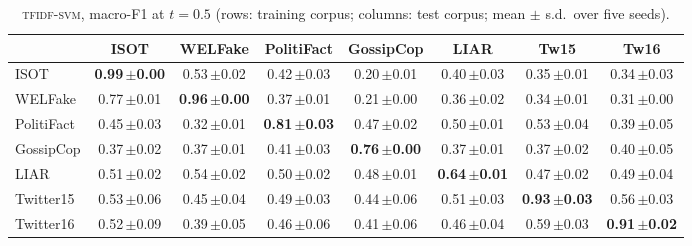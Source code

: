 \begin{table}[h]
\centering
\caption{\textsc{tfidf-svm}, macro-F1 at $t=0.5$ (rows: training corpus; columns: test corpus; mean $\pm$ s.d.\ over five seeds).}
\scriptsize
\begin{tabular}{@{}lccccccc@{}}
\toprule
 & ISOT & WELFake & PolitiFact & GossipCop & LIAR & Tw15 & Tw16 \\
\midrule
ISOT & \textbf{0.99\,{\tiny$\pm$0.00}} & 0.53\,{\tiny$\pm$0.02} & 0.42\,{\tiny$\pm$0.03} & 0.20\,{\tiny$\pm$0.01} & 0.40\,{\tiny$\pm$0.03} & 0.35\,{\tiny$\pm$0.01} & 0.34\,{\tiny$\pm$0.03} \\
WELFake & 0.77\,{\tiny$\pm$0.01} & \textbf{0.96\,{\tiny$\pm$0.00}} & 0.37\,{\tiny$\pm$0.01} & 0.21\,{\tiny$\pm$0.00} & 0.36\,{\tiny$\pm$0.02} & 0.34\,{\tiny$\pm$0.01} & 0.31\,{\tiny$\pm$0.00} \\
PolitiFact & 0.45\,{\tiny$\pm$0.03} & 0.32\,{\tiny$\pm$0.01} & \textbf{0.81\,{\tiny$\pm$0.03}} & 0.47\,{\tiny$\pm$0.02} & 0.50\,{\tiny$\pm$0.01} & 0.53\,{\tiny$\pm$0.04} & 0.39\,{\tiny$\pm$0.05} \\
GossipCop & 0.37\,{\tiny$\pm$0.02} & 0.37\,{\tiny$\pm$0.01} & 0.41\,{\tiny$\pm$0.03} & \textbf{0.76\,{\tiny$\pm$0.00}} & 0.37\,{\tiny$\pm$0.01} & 0.37\,{\tiny$\pm$0.02} & 0.40\,{\tiny$\pm$0.05} \\
LIAR & 0.51\,{\tiny$\pm$0.02} & 0.54\,{\tiny$\pm$0.02} & 0.50\,{\tiny$\pm$0.02} & 0.48\,{\tiny$\pm$0.01} & \textbf{0.64\,{\tiny$\pm$0.01}} & 0.47\,{\tiny$\pm$0.02} & 0.49\,{\tiny$\pm$0.04} \\
Twitter15 & 0.53\,{\tiny$\pm$0.06} & 0.45\,{\tiny$\pm$0.04} & 0.49\,{\tiny$\pm$0.03} & 0.44\,{\tiny$\pm$0.06} & 0.51\,{\tiny$\pm$0.03} & \textbf{0.93\,{\tiny$\pm$0.03}} & 0.56\,{\tiny$\pm$0.03} \\
Twitter16 & 0.52\,{\tiny$\pm$0.09} & 0.39\,{\tiny$\pm$0.05} & 0.46\,{\tiny$\pm$0.06} & 0.41\,{\tiny$\pm$0.06} & 0.46\,{\tiny$\pm$0.04} & 0.59\,{\tiny$\pm$0.03} & \textbf{0.91\,{\tiny$\pm$0.02}} \\
\bottomrule
\end{tabular}
\end{table}

